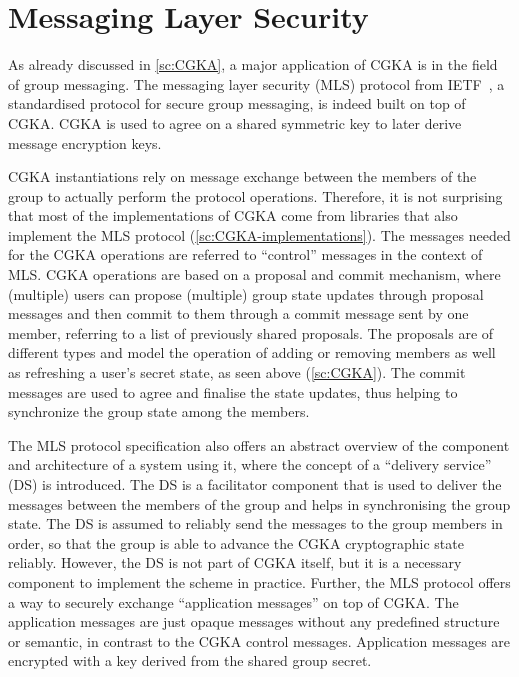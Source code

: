 \section{Messaging Layer Security}\label{sc:MLS}

As already discussed in \cref{sc:CGKA}, a major application of CGKA is in the field of group messaging.
The messaging layer security (MLS) protocol from IETF~\cite{rfc9420},
a standardised protocol for secure group messaging, is indeed 
built on top of CGKA. CGKA is used to agree on a shared symmetric key
to later derive message encryption keys.

CGKA instantiations rely on message exchange
between the members of the group to actually perform the protocol operations.
Therefore, it is not surprising that most of the implementations
of CGKA come from libraries that also implement the MLS protocol (\cref{sc:CGKA-implementations}).
The messages needed for the CGKA operations are referred to ``control'' messages in the context of MLS.
CGKA operations are based on a proposal and commit mechanism,
where (multiple) users can propose (multiple) group state updates
through proposal messages and then commit to them through a commit message
sent by one member, referring to a list of previously shared proposals. 
The proposals are of different types and model the operation of adding or removing 
members as well as refreshing a user's secret state, as seen above (\cref{sc:CGKA}).
The commit messages are used to agree and finalise the state updates,
thus helping to synchronize the group state among the members.

The MLS protocol specification also offers an abstract overview of
the component and architecture of a system using it, 
where the concept of a ``delivery service''
(DS) is introduced. The DS is a facilitator component that is used to 
deliver the messages between the members of the group and helps in
synchronising the group state. The DS is assumed to reliably
send the messages to the group members in order, so that the
group is able to advance the CGKA cryptographic state reliably.
However, the DS is not part of CGKA itself,
but it is a necessary component to implement the scheme in practice.
Further, the MLS protocol offers a way to securely exchange ``application messages''
on top of CGKA. The application messages are just opaque messages
without any predefined structure or semantic, in contrast to the
CGKA control messages.
Application messages are encrypted with a key derived from the shared group secret.

